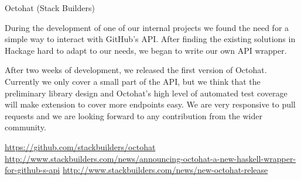 \documentclass[DIV16,twocolumn,10pt]{scrreprt}
\begin{document}
\begin{hcarentry}{Octohat (Stack Builders)}
\makeheader

During the development of one of our internal projects we found the
need for a simple way to interact with GitHub's API. After finding the
existing solutions in Hackage hard to adapt to our needs, we began to
write our own API wrapper.

After two weeks of development, we released the first version of
Octohat. Currently we only cover a small part of the API, but we think
that the preliminary library design and Octohat's high level of
automated test coverage will make extension to cover more endpoints
easy. We are very responsive to pull requests and we are looking
forward to any contribution from the wider community.

\FurtherReading
\url{https://github.com/stackbuilders/octohat} \url{http://www.stackbuilders.com/news/announcing-octohat-a-new-haskell-wrapper-for-github-s-api} \url{http://www.stackbuilders.com/news/new-octohat-release}
\end{hcarentry}
\end{document}
